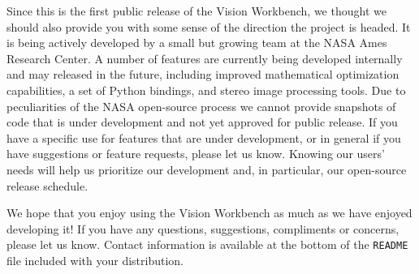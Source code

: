 Since this is the first public release of the Vision Workbench, we
thought we should also provide you with some sense of the direction
the project is headed.  It is being actively developed by a small but
growing team at the NASA Ames Research Center.  A number of features
are currently being developed internally and may released in the
future, including improved mathematical optimization capabilities, a
set of Python bindings, and stereo image processing tools.  Due to
peculiarities of the NASA open-source process we cannot provide
snapshots of code that is under development and not yet approved for
public release.  If you have a specific use for features that are
under development, or in general if you have suggestions or feature
requests, please let us know.  Knowing our users' needs will help us
prioritize our development and, in particular, our open-source release
schedule.

We hope that you enjoy using the Vision Workbench as much as we have
enjoyed developing it!  If you have any questions, suggestions,
compliments or concerns, please let us know.  Contact information is
available at the bottom of the \verb#README# file included with your
distribution.
